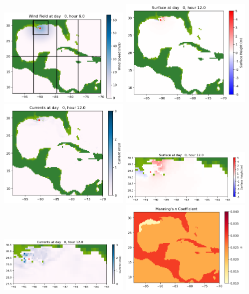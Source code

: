 \documentclass[11pt]{article}
\begin{document}
\vskip 10pt 
\includegraphics[width=0.475\textwidth]{frame0009fig1007.png}
\vskip 10pt 
\includegraphics[width=0.475\textwidth]{frame0010fig1001.png}
\includegraphics[width=0.475\textwidth]{frame0010fig1002.png}
\vskip 10pt 
\includegraphics[width=0.475\textwidth]{frame0010fig1003.png}
\includegraphics[width=0.475\textwidth]{frame0010fig1004.png}
\vskip 10pt 
\includegraphics[width=0.475\textwidth]{frame0010fig1005.png}
\end{document}

